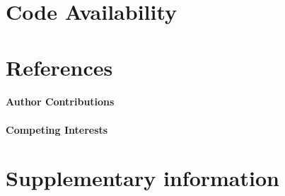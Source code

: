 \documentclass{article}
\begin{document}
\section*{Code Availability}


\section*{References}

\paragraph{Author Contributions}

\paragraph{Competing Interests}
  



\section*{Supplementary information}

\appendix
\renewcommand{\theequation}{S\arabic{equation}}
\renewcommand{\thefigure}{S\arabic{figure}}
\renewcommand{\thesection}{S\arabic{section}}
\renewcommand{\thetable}{S\arabic{table}}
\setcounter{table}{0}
\setcounter{figure}{0}
\end{document}
